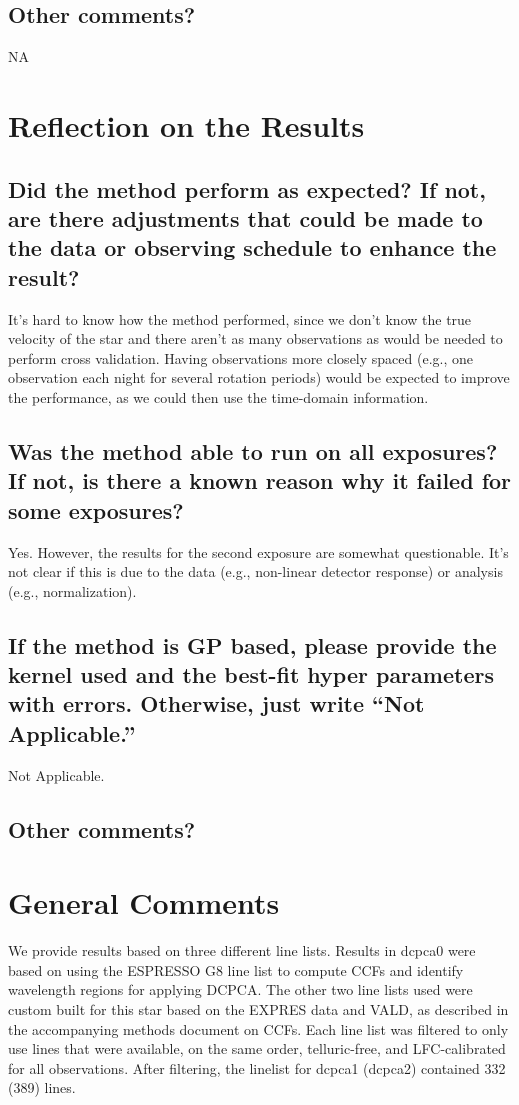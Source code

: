 \documentclass[12pt]{article}
\begin{document}
\subsection{Other comments?}

NA

\section{Reflection on the Results}
\subsection{Did the method perform as expected?  If not, are there adjustments that could be made to the data or observing schedule to enhance the result?}

It's hard to know how the method performed, since we don't know the true velocity of the star and there aren't as many observations as would be needed to perform cross validation.
Having observations more closely spaced (e.g., one observation each night for several rotation periods) would be expected to improve the performance, as we could then use the time-domain information.

\subsection{Was the method able to run on all exposures?  If not, is there a known reason why it failed for some exposures?}

Yes.
However, the results for the second exposure are somewhat questionable.
It's not clear if this is due to the data (e.g., non-linear detector response) or analysis (e.g., normalization).

\subsection{If the method is GP based, please provide the kernel used and the best-fit hyper parameters with errors.  Otherwise, just write ``Not Applicable.''}
Not Applicable.

\subsection{Other comments?}


\section{General Comments}

We provide results based on three different line lists.
Results in dcpca0 were based on using the ESPRESSO G8 line list to compute CCFs and identify wavelength regions for applying DCPCA.
The other two line lists used were custom built for this star based on the EXPRES data and VALD, as described in the accompanying methods document on CCFs.
Each line list was filtered to only use lines that were available, on the same order, telluric-free, and LFC-calibrated for all observations.
After filtering, the linelist for dcpca1 (dcpca2) contained 332 (389) lines.
\end{document}
